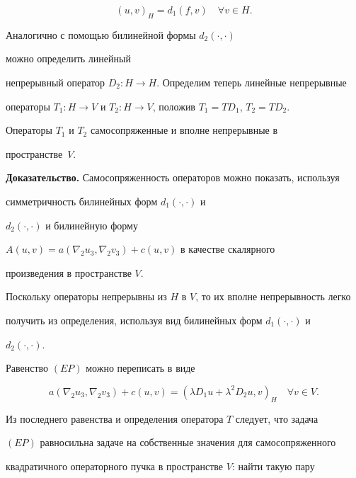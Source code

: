 $$


(u,v)_H=d_1(f,v) \quad \forall v \in H.


$$ 


Аналогично с помощью билинейной формы $d_2(\cdot,\cdot)$


можно определить линейный


непрерывный оператор $D_2:H\to H$. Определим теперь линейные непрерывные


операторы $T_1:H\to V$ и $T_2:H\to V$, положив $T_1=TD_1$, $T_2=TD_2$.





\begin{thms} Операторы $T_1$ и $T_2$ самосопряженные и вполне непрерывные в


пространстве~$V$.


\end{thms}





{\bf Доказательство.} Самосопряженность операторов можно показать, используя


симметричность билинейных форм $d_1(\cdot,\cdot)$ и


$d_2(\cdot,\cdot)$ и билинейную форму


$A(u,v)=a(\nabla_2{u_3},\nabla_2{v_3})+c(u,v)$ в качестве скалярного


произведения в пространстве $V$.





Поскольку операторы непрерывны из $H$ в $V$, то их вполне непрерывность легко


получить из определения, используя вид билинейных форм $d_1(\cdot,\cdot)$ и


$d_2(\cdot,\cdot)$.





Равенство $(EP)$ можно переписать в виде


$$


a(\nabla_2{u_3},\nabla_2{v_3})+c(u,v)=


(\lambda D_{1}u+\lambda^{2}D_{2}u,v)_H \quad \forall v \in V.


$$


Из последнего равенства и определения оператора $T$ следует, что задача


$(EP)$ равносильна задаче на собственные значения для самосопряженного


квадратичного операторного пучка в пространстве $V$: найти такую пару


